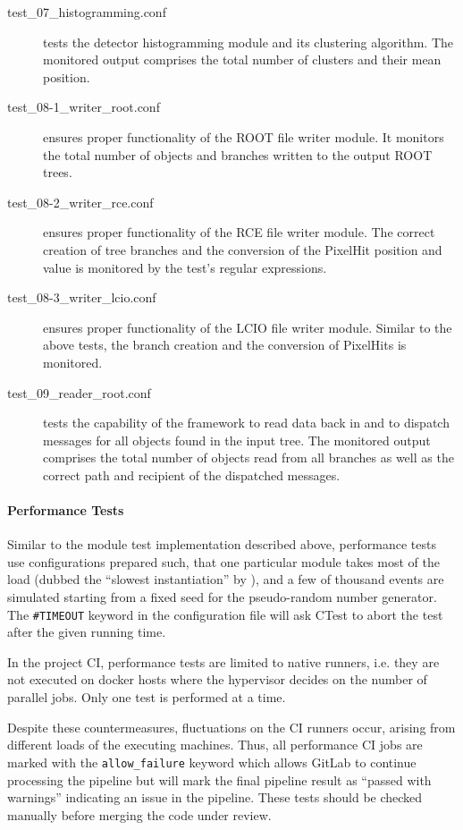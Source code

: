 \begin{description}
    \item[test\_07\_histogramming.conf] tests the detector histogramming module and its clustering algorithm. The monitored output comprises the total number of clusters and their mean position.
    \item[test\_08-1\_writer\_root.conf] ensures proper functionality of the ROOT file writer module. It monitors the total number of objects and branches written to the output ROOT trees.
    \item[test\_08-2\_writer\_rce.conf] ensures proper functionality of the RCE file writer module. The correct creation of tree branches and the conversion of the PixelHit position and value is monitored by the test's regular expressions.
    \item[test\_08-3\_writer\_lcio.conf] ensures proper functionality of the LCIO file writer module. Similar to the above tests, the branch creation and the conversion of PixelHits is monitored.
    \item[test\_09\_reader\_root.conf] tests the capability of the framework to read data back in and to dispatch messages for all objects found in the input tree. The monitored output comprises the total number of objects read from all branches as well as the correct path and recipient of the dispatched messages.
\end{description}

\paragraph{Performance Tests}

Similar to the module test implementation described above, performance tests use configurations prepared such, that one particular module takes most of the load (dubbed the ``slowest instantiation'' by \apsq), and a few of thousand events are simulated starting from a fixed seed for the pseudo-random number generator.
The \texttt{\#TIMEOUT} keyword in the configuration file will ask CTest to abort the test after the given running time.

In the project CI, performance tests are limited to native runners, i.e. they are not executed on docker hosts where the hypervisor decides on the number of parallel jobs.
Only one test is performed at a time.

Despite these countermeasures, fluctuations on the CI runners occur, arising from different loads of the executing machines.
Thus, all performance CI jobs are marked with the \texttt{allow\_failure} keyword which allows GitLab to continue processing the pipeline but will mark the final pipeline result as ``passed with warnings'' indicating an issue in the pipeline.
These tests should be checked manually before merging the code under review.

